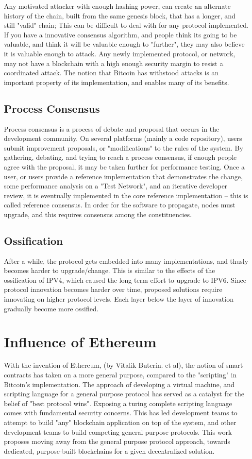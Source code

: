 \documentclass[12pt, titlepage, twocolumn]{report}
\begin{document}
Any motivated attacker with enough hashing power, can create an alternate history of the chain, built from the same genesis block, that has a longer, and still "valid" chain; This can be difficult to deal with for any protocol implemented. If you have a innovative consensus algorithm, and people think its going to be valuable, and think it will be valuable enough to "further", they may also believe it is valuable enough to attack. Any newly implemented protocol, or network, may not have a blockchain with a high enough security margin to resist a coordinated attack. The notion that Bitcoin has withstood attacks is an important property of its implementation, and enables many of its benefits.

\subsection{Process Consensus}
Process consensus is a process of debate and proposal that occurs in the development community. On several platforms (mainly a code repository), users submit improvement proposals, or "modifications" to the rules of the system. By gathering, debating, and trying to reach a process consensus, if enough people agree with the proposal, it may be taken further for performance testing. Once a user, or users provide a reference implementation that demonstrates the change, some performance analysis on a "Test Network", and an iterative developer review, it is eventually implemented in the core reference implementation -- this is called reference consensus. In order for the software to propagate, nodes must upgrade, and this requires consensus among the constituencies.

\subsection{Ossification}
After a while, the protocol gets embedded into many implementations, and thusly becomes harder to upgrade/change. This is similar to the effects of the ossification of IPV4, which caused the long term effort to upgrade to IPV6. Since protocol innovation becomes harder over time, proposed solutions require innovating on higher protocol levels. Each layer below the layer of innovation gradually become more ossified. 


\section{Influence of Ethereum}
With the invention of Ethereum, (by Vitalik Buterin. et al), the notion of smart contracts has taken on a more general purpose, compared to the "scripting" in Bitcoin's implementation. The approach of developing a virtual machine, and scripting language for a general purpose protocol has served as a catalyst for the belief of "best protocol wins". Exposing a turing complete scripting language comes with fundamental security concerns. This has led development teams to attempt to build "any" blockchain application on top of the system, and other development teams to build competing general purpose protocols. This work proposes moving away from the general purpose protocol approach, towards dedicated, purpose-built blockchains for a given decentralized solution. 
\end{document}
